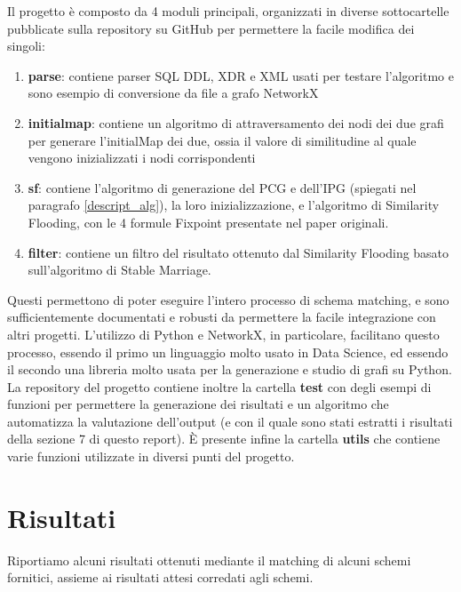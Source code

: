\documentclass[a4paper,10pt]{article}
\begin{document}
Il progetto è composto da 4 moduli principali, organizzati in diverse sottocartelle pubblicate sulla repository su GitHub per permettere la facile modifica dei singoli:
\begin{enumerate}
	\item \textbf{parse}: contiene parser SQL DDL, XDR e XML usati per testare l'algoritmo e sono esempio di conversione da file a grafo NetworkX
	\item \textbf{initialmap}: contiene un algoritmo di attraversamento dei nodi dei due grafi per generare l'initialMap dei due, ossia il valore di similitudine al quale vengono inizializzati i nodi corrispondenti
	\item \textbf{sf}: contiene l'algoritmo di generazione del PCG e dell'IPG (spiegati nel paragrafo \ref{descript_alg}), la loro inizializzazione, e l'algoritmo di Similarity Flooding, con le 4 formule Fixpoint presentate nel paper originali. 
	\item \textbf{filter}: contiene un filtro del risultato ottenuto dal Similarity Flooding basato sull'algoritmo di Stable Marriage.
\end{enumerate}
Questi permettono di poter eseguire l'intero processo di schema matching, e sono sufficientemente documentati e robusti da permettere la facile integrazione con altri progetti. L'utilizzo di Python e NetworkX, in particolare, facilitano questo processo, essendo il primo un linguaggio molto usato in Data Science, ed essendo il secondo una libreria molto usata per la generazione e studio di grafi su Python.\\

La repository del progetto contiene inoltre la cartella \textbf{test} con degli esempi di funzioni per permettere la generazione dei risultati e un algoritmo che automatizza la valutazione dell'output (e con il quale sono stati estratti i risultati della sezione 7 di questo report). È presente infine la cartella \textbf{utils} che contiene varie funzioni utilizzate in diversi punti del progetto.


\section{Risultati}

Riportiamo alcuni risultati ottenuti mediante il matching di alcuni schemi fornitici, assieme ai risultati attesi corredati agli schemi.\\
\end{document}
